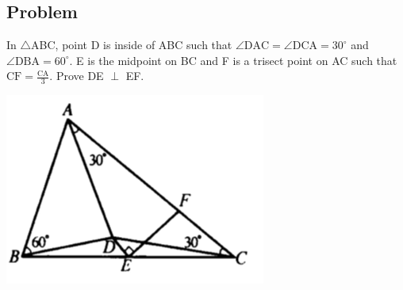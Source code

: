 \documentclass{article}
\begin{document}
\subsection{Problem}
In \(\triangle\)ABC, point D is inside of ABC such that \(\angle \mathrm{DAC} = \angle \mathrm{DCA}=30^{\circ} \) and \(\angle \mathrm{DBA}=60^{\circ}\). E is the midpoint on BC and F is a trisect point on AC such that \(\mathrm{CF} = \frac{\mathrm{CA}}{3} \). Prove DE \(\perp\) EF.

\includegraphics{Picture21.png}
\end{document}
